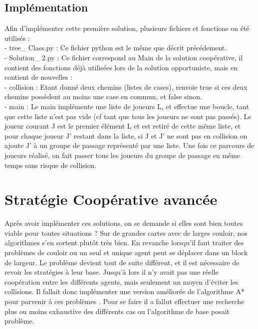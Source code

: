 \documentclass{article}
\begin{document}
\subsection{Implémentation}

Afin d'implémenter cette première solution, plusieurs fichiers et fonctions on été utilisés : \\ 

- tree\_ Class.py : Ce fichier python est le même que décrit précédement.\\ 

- Solution\_ 2.py : Ce fichier correspond au Main de la solution coopérative, il contient des fonctions déjà utilisées lors de la solution opportuniste, mais en contient de nouvelles : \\ 

- collision : Etant donné deux chemins (listes de cases), renvoie true si ces deux chemins possèdent au moins une case en commun, et false sinon. \\ 
	
- main : Le main implémente une liste de joueurs L, et effectue une boucle, tant que cette liste n'est pas vide (cf tant que tous les joueurs ne sont pas passés). Le joueur courant J est le premier élément L et est retiré de cette même liste, et pour chaque joueur J' restant dans la liste, si J et J' ne sont pas en collision on ajoute J' à un groupe de passage représenté par une liste. Une fois ce parcours de joueurs réalisé, on fait passer tous les joueurs du groupe de passage en même temps sans risque de collision.\\

\section{Stratégie Coopérative avancée}

Après avoir implémenter ces solutions, on se demande si elles sont bien toutes viable pour toutes situations ? Sur de grandes cartes avec de larges couloir, nos algorithmes s’en sortent plutôt très bien. En revanche lorsqu’il faut traiter des problèmes de couloir ou un seul et unique agent peut se déplacer dans un block de largeur. Le problème devient tout de suite différent, et  il est nécessaire de revoir les stratégies à leur base. Jusqu'à lors il n’y avait pas une réelle coopération entre les différents agents, mais seulement un moyen d’éviter les collisions. Il fallait donc implémenter une version améliorée de l’algorithme A* pour parvenir à ces problèmes . Pour se faire il a fallut effectuer une recherche plus ou moins exhaustive des différents cas ou l’algorithme de base posait problème.
\\
\end{document}
